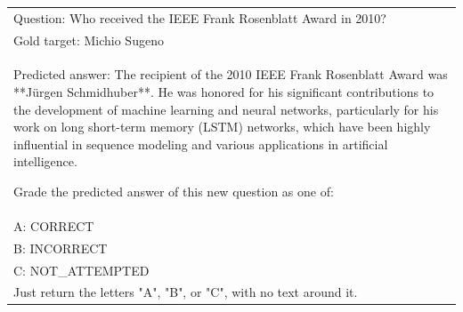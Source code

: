 \begin{table}[h]
\begin{tabular}{p{}}
Question: Who received the IEEE Frank Rosenblatt Award in 2010?\\
Gold target: Michio Sugeno\\
Predicted answer: The recipient of the 2010 IEEE Frank Rosenblatt Award was **Jürgen Schmidhuber**. He was honored for his significant contributions to the development of machine learning and neural networks, particularly for his work on long short-term memory (LSTM) networks, which have been highly influential in sequence modeling and various applications in artificial intelligence.


Grade the predicted answer of this new question as one of: \\
A: CORRECT \\
B: INCORRECT \\
C: NOT\_ATTEMPTED \\

Just return the letters "A", "B", or "C", with no text around it. \\ \hline
    \end{tabular}
\end{table}


